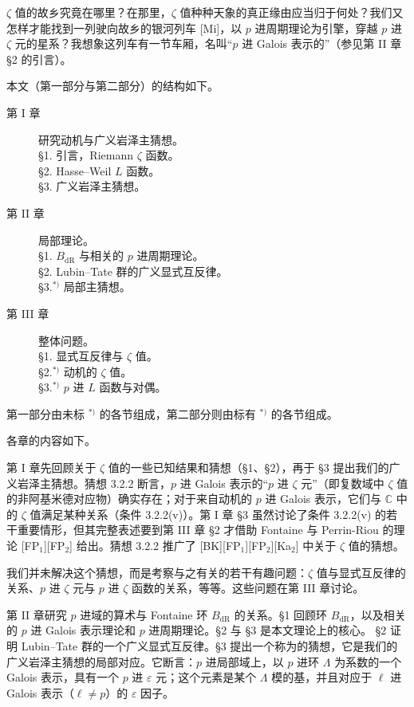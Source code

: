 $\zeta$ 值的故乡究竟在哪里？在那里，$\zeta$ 值种种天象的真正缘由应当归于何处？我们又怎样才能找到一列驶向故乡的银河列车 [Mi]，以 $p$ 进周期理论为引擎，穿越 $p$ 进 $\zeta$ 元的星系？我想象这列车有一节车厢，名叫“$p$ 进 Galois 表示的”（参见第 II 章 §2 的引言）。

本文（第一部分与第二部分）的结构如下。
\begin{description}
\item[第 I 章] 研究动机与广义岩泽主猜想。\\
§1. 引言，Riemann $\zeta$ 函数。\\
§2. Hasse--Weil $L$ 函数。\\
§3. 广义岩泽主猜想。
\item[第 II 章] 局部理论。\\
§1. $B_{\mathrm{dR}}$ 与相关的 $p$ 进周期理论。\\
§2. Lubin--Tate 群的广义显式互反律。\\
§3.$^{*)}$ 局部主猜想。
\end{description}
\begin{description}
\item[第 III 章] 整体问题。\\
§1. 显式互反律与 $\zeta$ 值。\\
§2.$^{*)}$ 动机的 $\zeta$ 值。\\
§3.$^{*)}$ $p$ 进 $L$ 函数与对偶。
\end{description}
第一部分由未标 $^{*)}$ 的各节组成，第二部分则由标有 $^{*)}$ 的各节组成。

各章的内容如下。

第 I 章先回顾关于 $\zeta$ 值的一些已知结果和猜想（§1、§2），再于 §3 提出我们的广义岩泽主猜想。猜想 3.2.2 断言，$p$ 进 Galois 表示的“$p$ 进 $\zeta$ 元”（即复数域中 $\zeta$ 值的非阿基米德对应物）确实存在；对于来自动机的 $p$ 进 Galois 表示，它们与 $\mathbb C$ 中的 $\zeta$ 值满足某种关系（条件 3.2.2(v)）。第 I 章 §3 虽然讨论了条件 3.2.2(v) 的若干重要情形，但其完整表述要到第 III 章 §2 才借助 Fontaine 与 Perrin-Riou 的理论 [FP$_1$][FP$_2$] 给出。猜想 3.2.2 推广了 [BK][FP$_1$][FP$_2$][Ka$_2$] 中关于 $\zeta$ 值的猜想。

我们并未解决这个猜想，而是考察与之有关的若干有趣问题：$\zeta$ 值与显式互反律的关系、$p$ 进 $\zeta$ 元与 $p$ 进 $\zeta$ 函数的关系，等等。这些问题在第 III 章讨论。

第 II 章研究 $p$ 进域的算术与 Fontaine 环 $B_{\mathrm{dR}}$ 的关系。§1 回顾环 $B_{\mathrm{dR}}$，以及相关的 $p$ 进 Galois 表示理论和 $p$ 进周期理论。§2 与 §3 是本文理论上的核心。
§2 证明 Lubin--Tate 群的一个广义显式互反律。§3 提出一个称为的猜想，它是我们的广义岩泽主猜想的局部对应。它断言：$p$ 进局部域上，以 $p$ 进环 $\Lambda$ 为系数的一个 Galois 表示，具有一个 $p$ 进 $\varepsilon$ 元；这个元素是某个 $\Lambda$ 模的基，并且对应于 $\ell$ 进 Galois 表示（$\ell\ne p$）的 $\varepsilon$ 因子。

